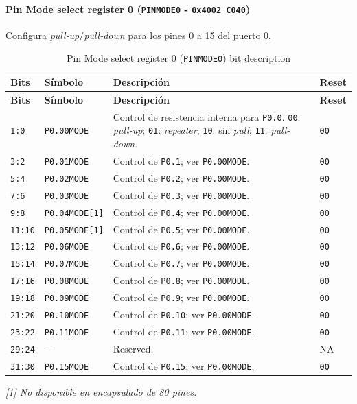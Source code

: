 \paragraph{Pin Mode select register 0 (\texttt{PINMODE0} - \texttt{0x4002 C040})}
Configura \textit{pull-up}/\textit{pull-down} para los pines 0 a 15 del puerto 0.

\begin{longtable}{|>{\raggedright\arraybackslash}p{}|>{\raggedright\arraybackslash}p{}|>{\raggedright\arraybackslash}p{}|>{\centering\arraybackslash}p{}|}
\caption{Pin Mode select register 0 (\texttt{PINMODE0}) bit description}\\
\hline
\textbf{Bits} & \textbf{Símbolo} & \textbf{Descripción} & \textbf{Reset} \\
\hline
\endfirsthead
\hline
\textbf{Bits} & \textbf{Símbolo} & \textbf{Descripción} & \textbf{Reset} \\
\hline
\endhead
\texttt{1:0} & \texttt{P0.00MODE} & Control de resistencia interna para \texttt{P0.0}. \texttt{00}: \textit{pull-up}; \texttt{01}: \textit{repeater}; \texttt{10}: sin \textit{pull}; \texttt{11}: \textit{pull-down}. & \texttt{00} \\
\hline
\texttt{3:2} & \texttt{P0.01MODE} & Control de \texttt{P0.1}; ver \texttt{P0.00MODE}. & \texttt{00} \\
\hline
\texttt{5:4} & \texttt{P0.02MODE} & Control de \texttt{P0.2}; ver \texttt{P0.00MODE}. & \texttt{00} \\
\hline
\texttt{7:6} & \texttt{P0.03MODE} & Control de \texttt{P0.3}; ver \texttt{P0.00MODE}. & \texttt{00} \\
\hline
\texttt{9:8} & \texttt{P0.04MODE[1]} & Control de \texttt{P0.4}; ver \texttt{P0.00MODE}. & \texttt{00} \\
\hline
\texttt{11:10} & \texttt{P0.05MODE[1]} & Control de \texttt{P0.5}; ver \texttt{P0.00MODE}. & \texttt{00} \\
\hline
\texttt{13:12} & \texttt{P0.06MODE} & Control de \texttt{P0.6}; ver \texttt{P0.00MODE}. & \texttt{00} \\
\hline
\texttt{15:14} & \texttt{P0.07MODE} & Control de \texttt{P0.7}; ver \texttt{P0.00MODE}. & \texttt{00} \\
\hline
\texttt{17:16} & \texttt{P0.08MODE} & Control de \texttt{P0.8}; ver \texttt{P0.00MODE}. & \texttt{00} \\
\hline
\texttt{19:18} & \texttt{P0.09MODE} & Control de \texttt{P0.9}; ver \texttt{P0.00MODE}. & \texttt{00} \\
\hline
\texttt{21:20} & \texttt{P0.10MODE} & Control de \texttt{P0.10}; ver \texttt{P0.00MODE}. & \texttt{00} \\
\hline
\texttt{23:22} & \texttt{P0.11MODE} & Control de \texttt{P0.11}; ver \texttt{P0.00MODE}. & \texttt{00} \\
\hline
\texttt{29:24} & --- & Reserved. & NA \\
\hline
\texttt{31:30} & \texttt{P0.15MODE} & Control de \texttt{P0.15}; ver \texttt{P0.00MODE}. & \texttt{00} \\
\hline
\end{longtable}
\noindent\textit{[1] No disponible en encapsulado de 80 pines.}


